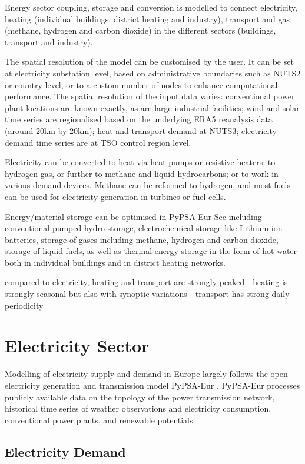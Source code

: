 Energy sector coupling, storage and conversion is modelled to connect
electricity, heating (individual buildings, district heating and industry),
transport and gas (methane, hydrogen and carbon dioxide) in the different
sectors (buildings, transport and industry).

The spatial resolution of the model can be customised by the user. It can be set
at electricity substation level, based on administrative boundaries such as
NUTS2 or country-level, or to a custom number of nodes to enhance computational
performance. The spatial resolution of the input data varies: conventional power
plant locations are known exactly, as are large industrial facilities; wind and
solar time series are regionalised based on the underlying ERA5 reanalysis data
(around 20km by 20km); heat and transport demand at NUTS3; electricity demand
time series are at TSO control region level.

Electricity can be converted to heat via heat pumps or resistive heaters; to
hydrogen gas, or further to methane and liquid hydrocarbons; or to work in
various demand devices. Methane can be reformed to hydrogen, and most fuels can
be used for electricity generation in turbines or fuel cells.

Energy/material storage can be optimised in PyPSA-Eur-Sec including conventional
pumped hydro storage, electrochemical storage like Lithium ion batteries,
storage of gases including methane, hydrogen and carbon dioxide, storage of
liquid fuels, as well as thermal energy storage in the form of hot water both in
individual buildings and in district heating networks.

compared to electricity, heating and transport are strongly peaked
- heating is strongly seasonal but also with synoptic variations
- transport has strong daily periodicity

\section{Electricity Sector}
\label{sec:si:electricity}

Modelling of electricity supply and demand in Europe largely follows the open
electricity generation and transmission model PyPSA-Eur
. PyPSA-Eur processes publicly available data on
the topology of the power transmission network, historical time series of
weather observations and electricity consumption, conventional power plants, and
renewable potentials.

\subsection{Electricity Demand}
\label{sec:si:electricity:demand}

